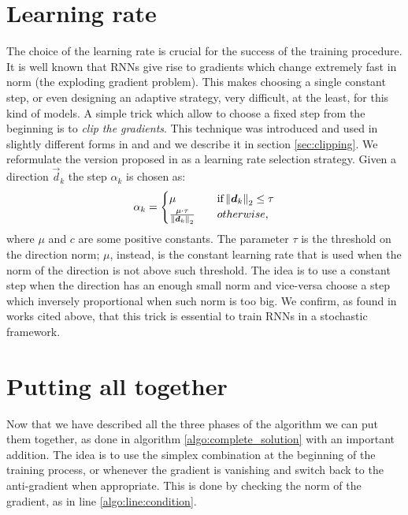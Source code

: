 \section{Learning rate}

The choice of the learning rate is crucial for the success of the training procedure. It is well known that RNNs give rise to gradients which change extremely fast in norm (the exploding gradient problem). This makes choosing a single constant step, or even designing an adaptive strategy, very difficult, at the least, for this kind of models. A simple trick which allow to choose a fixed step from the beginning is to \textit{clip the gradients}. This technique was introduced and used in slightly different forms in \cite{understandingExplodingGradients} and \cite{clippingMikolov} and we describe it in section \ref{sec:clipping}. We reformulate the version proposed in \cite{understandingExplodingGradients} as a learning rate selection strategy.
Given a direction $\vec{d}_k$ the step $\alpha_k$ is chosen as:
\begin{equation}
\alpha_k = 
\begin{cases}
	\mu  \quad &\mbox{if} \left\Vert \boldsymbol{d}_k \right\Vert_2 \leq \tau\\
	\frac{\mu \cdot \tau}{\left\Vert \boldsymbol{d}_k \right\Vert_2} \quad & otherwise,
\end{cases}
\end{equation}
where $\mu$ and $c$ are some positive constants. The parameter $\tau$ is the threshold on the direction norm; $\mu$, instead, is the constant learning rate that is used when the norm of the direction is not above such threshold. The idea is to use a constant step when the direction has an enough small norm and vice-versa choose a step which inversely proportional when such norm is too big. We confirm, as found in works cited above, that this trick is essential to train RNNs in a stochastic framework.

\section{Putting all together}
Now that we have described all the three phases of the algorithm we can put them together, as done in algorithm \ref{algo:complete_solution} with an important addition. The idea is to use the simplex combination at the beginning of the training process, or whenever the gradient is vanishing and switch back to the anti-gradient when appropriate. This is done by checking the norm of the gradient, as in line \ref{algo:line:condition}.



